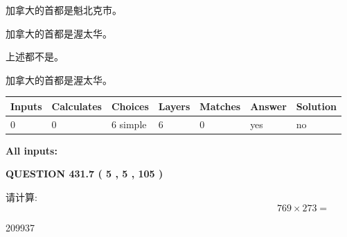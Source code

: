\documentclass{ctexart}
\begin{document}
 
加拿大的首都是魁北克市。
 
 
加拿大的首都是渥太华。
 
 
 上述都不是。
 
 
\noindent{}
 
 
加拿大的首都是渥太华。
 
 
\noindent{}
 
 
   
   
   
   
\noindent\begin{tabular}{|l|l|l|l|l|l|l|}
 \hline
Inputs & Calculates & Choices & Layers & Matches & Answer & Solution \\ \hline
 0  & 
 0  & 
 6
  simple  
  & 
 6  & 
 0  & 
  yes & 
  no 
  \\ \hline
 \end{tabular}
   
   
   
   
\noindent{}
   
   
   
   
\noindent\vspace{0.1in}\hspace{-0.08in} {\textbf{\Large{All inputs: }}}
   
   
  
\vspace{0.2in}
  
{\textbf{\Large{QUESTION
431.7 
 ( 5 , 5 , 105 )
}}}
  
  
 
请计算:
\begin{equation}
769  \times    %
273 = \nonumber
\end{equation}
 
 
 
\noindent{}
 
 

209937
 
 
\noindent{}
 
 
\end{document}
